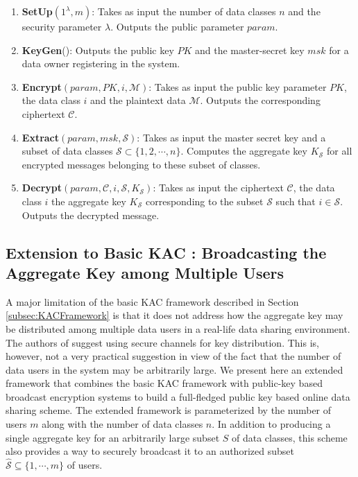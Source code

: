 \begin{enumerate}
 \item \textbf{SetUp}$(1^{\lambda},m)$: Takes as input the number of data classes $n$ and the security parameter $\lambda$. Outputs the public parameter $param$. 
 
 \item \textbf{KeyGen}(): Outputs the public key $PK$ and the master-secret key $msk$ for a data owner registering in the system. 
 
 \item \textbf{Encrypt}$(param,PK,i,\mathcal{M})$: Takes as input the public key parameter $PK$, the data class $i$ and the plaintext data $\mathcal{M}$. Outputs the corresponding ciphertext $\mathcal{C}$. 
 
 \item \textbf{Extract}$(param,msk,\mathcal{S})$: Takes as input the master secret key and a subset of data classes $\mathcal{S} \subset\{1,2,\cdots,n\}$. Computes the aggregate key $K_{\mathcal{S}}$ for all encrypted messages belonging to these subset of classes.
 
 \item \textbf{Decrypt}$(param,\mathcal{C},i,\mathcal{S},K_{\mathcal{S}})$: Takes as input the ciphertext $\mathcal{C}$, the data class $i$ the aggregate key $K_{\mathcal{S}}$ corresponding to the subset $\mathcal{S}$ such that $i\in\mathcal{S}$. Outputs the decrypted message.
\end{enumerate}


\subsection{Extension to Basic KAC : Broadcasting the Aggregate Key among Multiple Users}
\label{subsec:extendedKAC}

A major limitation of the basic KAC framework described in Section \ref{subsec:KACFramework} is that it does not address how the aggregate key may be distributed among multiple data users in a real-life data sharing environment. The authors of \cite{chu2014key} suggest using secure channels for key distribution. This is, however, not a very practical suggestion in view of the fact that the number of data users in the system may be arbitrarily large. We present here an extended framework that combines the basic KAC framework with public-key based broadcast encryption systems \cite{boneh2005collusion} to build a full-fledged public key based online data sharing scheme. The extended framework is parameterized by the number of users $m$ along with the number of data classes $n$. In addition to producing a single aggregate key for an arbitrarily large subset $S$ of data classes, this scheme also provides a way to securely broadcast it to an authorized subset $\hat{\mathcal{S}}\subseteq\{1,\cdots,m\}$ of users. 



